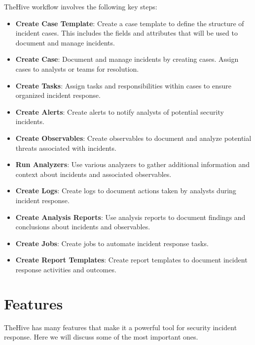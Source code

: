 \documentclass{article}
\begin{document}
TheHive workflow involves the following key steps:

\begin{itemize}
    \item \textbf{Create Case Template}: Create a case template to define the structure of incident cases. This includes the fields and attributes that will be used to document and manage incidents.

    \item \textbf{Create Case}: Document and manage incidents by creating cases. Assign cases to analysts or teams for resolution.

    \item \textbf{Create Tasks}: Assign tasks and responsibilities within cases to ensure organized incident response.

    \item \textbf{Create Alerts}: Create alerts to notify analysts of potential security incidents.

    \item \textbf{Create Observables}: Create observables to document and analyze potential threats associated with incidents.

    \item \textbf{Run Analyzers}: Use various analyzers to gather additional information and context about incidents and associated observables.

    \item \textbf{Create Logs}: Create logs to document actions taken by analysts during incident response.

    \item \textbf{Create Analysis Reports}: Use analysis reports to document findings and conclusions about incidents and observables.

    \item \textbf{Create Jobs}: Create jobs to automate incident response tasks.

    \item \textbf{Create Report Templates}: Create report templates to document incident response activities and outcomes.
\end{itemize}




\section*{Features}
TheHive has many features that make it a powerful tool for security incident response. Here we will discuss some of the most important ones.
\end{document}
